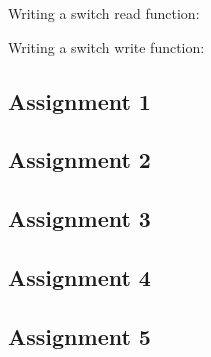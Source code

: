 \documentclass[
	letterpaper, %
	10pt, %
]{CSUniSchoolLabReport}
\begin{document}
  \item Writing a switch read function:

   

\item Writing a switch write function:

 


\subsection{Assignment 1}

\subsection{Assignment 2}

\subsection{Assignment 3}

\subsection{Assignment 4}

\subsection{Assignment 5}
\end{document}
